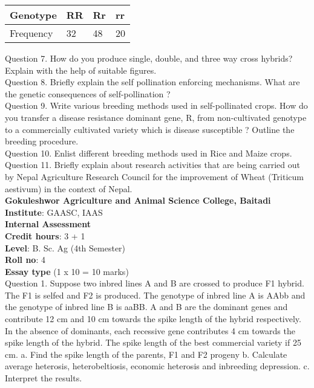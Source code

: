 \documentclass[12pt]{article}\usepackage[]{graphicx}\usepackage[]{color}
\begin{document}
\begin{table}[H]
\centering\begingroup\fontsize{8}{10}\selectfont

\begin{tabular}[t]{llll}
\toprule
Genotype & RR & Rr & rr\\
\midrule
Frequency & 32 & 48 & 20\\
\bottomrule
\end{tabular}
\endgroup{}
\end{table}
Question 7. How do you produce single, double, and three way cross hybrids? Explain with the help of suitable figures.\\
Question 8. Briefly explain the self pollination enforcing mechanisms. What are the genetic consequences of self-pollination ?\\
Question 9. Write various breeding methods used in self-pollinated crops. How do you transfer a disease resistance dominant gene, R, from non-cultivated genotype to a commercially cultivated variety which is disease susceptible ? Outline the breeding procedure.\\
Question 10. Enlist different breeding methods used in Rice and Maize crops.\\
Question 11. Briefly explain about research activities that are being carried out by Nepal Agriculture Research Council for the improvement of Wheat (Triticum aestivum) in the context of Nepal.\\
\clearpage 
{\centering \Large{\textbf{Gokuleshwor Agriculture and Animal Science College, Baitadi}} \\[0.25cm]
            \textbf{Institute}: GAASC, IAAS \\[0.2cm]
            \textbf{Internal Assessment} \\[0.2cm]} 
\textbf{Credit hours}: 3 + 1 \\ 
\textbf{Level}: B. Sc. Ag (4th Semester) \\
\textbf{Roll no}: 4 \\[0.5cm] 
\textbf{Essay type} (1 x 10 = 10 marks) \\
Question 1. Suppose two inbred lines A and B are crossed to produce F1 hybrid. The F1 is selfed and F2 is produced. The genotype of inbred line A is AAbb and the genotype of inbred line B is aaBB. A and B are the dominant genes and contribute 12 cm and 10 cm towards the spike length of the hybrid respectively. In the absence of dominants, each recessive gene contributes 4 cm towards the spike length of the hybrid. The spike length of the best commercial variety if 25 cm. a. Find the spike length of the parents, F1 and F2 progeny b. Calculate average heterosis, heterobeltiosis, economic heterosis and inbreeding depression. c. Interpret the results.\\
\end{document}
